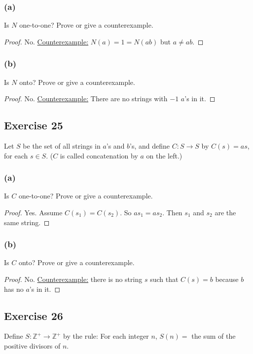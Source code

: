 \documentclass[14pt]{extarticle}
\newcommand{\Z}{\mathbb{Z}}
\begin{document}
\subsubsection{(a)}
Is $N$ one-to-one? Prove or give a counterexample. 

\begin{proof}
No. \underline{Counterexample:} $N(a) = 1 = N(ab)$ but $a \neq ab$.
\end{proof}

\subsubsection{(b)}
Is $N$ onto? Prove or give a counterexample. 

\begin{proof}
No. \underline{Counterexample:} There are no strings with $-1$ $a$'s in it.
\end{proof}

\subsection{Exercise 25}
Let $S$ be the set of all strings in $a$’s and $b$’s, and
define \(C: S \to S\) by \(C(s) = as\), for each $s \in S$.
($C$ is called concatenation by $a$ on the left.)

\subsubsection{(a)}
Is $C$ one-to-one? Prove or give a counterexample.

\begin{proof}
Yes. Assume \(C(s_1) = C(s_2)\). So \(as_1 = as_2\). Then $s_1$ and $s_2$ are the same string.
\end{proof}

\subsubsection{(b)}
Is $C$ onto? Prove or give a counterexample.

\begin{proof}
No. \underline{Counterexample:} there is no string $s$ such that \(C(s) = b\) because $b$ has no $a$'s in it.
\end{proof}

\subsection{Exercise 26}
Define \(S: \Z^+ \to \Z^+\) by the rule: For each integer $n$, $S(n) =$ the sum of the positive divisors of $n$.
\end{document}
